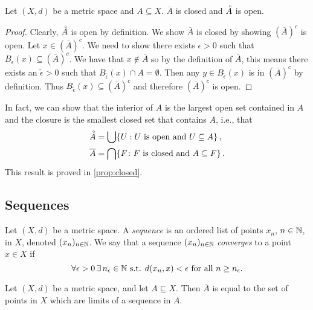 \documentclass{article}
\begin{document}
\begin{proposition}
 Let $(X,d)$ be a metric space and $A\subseteq X$. $\overline A$ is closed and $\accentset{\circ} A$ is open.
\end{proposition}
\begin{proof}
Clearly, $\accentset{\circ} A$ is open by definition. We show $\overline A$ is closed by showing $(\overline A)^c$ is open. Let $x \in (\overline A)^c$. We need to show there exists $\epsilon>0$ such that $B_\epsilon(x) \subseteq (\overline A)^c$. We have that $x \notin \overline A$ so by the definition of $\overline A$, this means there exists an $\tilde \epsilon  > 0$ such that $B_{\tilde\epsilon}(x) \cap A = \emptyset$. Then any $y \in B_{\tilde\epsilon}(x)$ is in $(\overline A)^c$ by definition. Thus $B_{\tilde\epsilon}(x)  \subseteq (\overline A)^c$ and therefore $(\overline A)^c$ is open.
\end{proof}

\begin{remark}
In fact, we can show that the interior of $A$ is the largest open set contained in $A$ and the closure is the smallest closed set that contains $A$, i.e., that 
\begin{align*}
\accentset{\circ} A &=\bigcup \{U: U \text{ is open and } U \subseteq A \} \, , \\\overline{A} &= \bigcap \{F \colon F \text{ is closed and } A \subseteq F\} \, .
\end{align*}
This result is proved in \cref{prop:closed}.
\end{remark}

\subsection{Sequences}

\begin{definition}
Let $(X,d)$ be a metric space. A \emph{sequence} is an ordered list of points $x_n$, $n\in{\mathbb{N}}$, in $X$, denoted $(x_n)_{n \in {\mathbb{N}}}$. We say that a sequence $(x_n)_{n \in {\mathbb{N}}}$ \emph{converges} to a point $x \in X$ if 
\begin{equation*}
    \forall \epsilon > 0 \, \exists \, n_\epsilon \in {\mathbb{N}} \text{ s.t. } d(x_n,x) < \epsilon \text{ for all } n \geq n_\epsilon .
\end{equation*}
\end{definition}

\begin{proposition}
\label{prop:closure_limit}
Let $(X, d)$ be a metric space, and let $A \subseteq X$. Then $\overline A$ is equal to the set of points in $X$ which are limits of a sequence in $A$.
\end{proposition}
\end{document}
